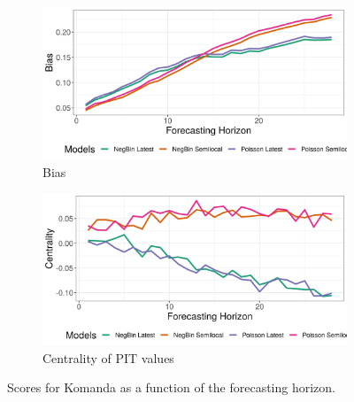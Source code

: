\begin{figure}[H]
\begin{subfigure}{0.5\textwidth}
  \centering
  \includegraphics[width=\linewidth]{../output/Komanda_bias.png}  
  \caption{Bias}
  \label{fig:Komanda_scores_3}
\end{subfigure}
\begin{subfigure}{0.5\textwidth}
  \centering
  \includegraphics[width=\linewidth]{../output/Komanda_centrality.png}  
  \caption{Centrality of PIT values}
  \label{fig:Komanda_scores_4}
\end{subfigure}
  \caption{Scores for Komanda as a function of the forecasting horizon.}

  \label{fig:nat_scores}
\end{figure}
